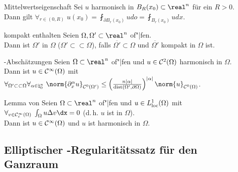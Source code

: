 \begin{Satz}{Mittelwertseigenschaft}
    Sei $u$ harmonisch in $B_R(x_0) \subset \real^n$ für ein $R > 0$.\\
    Dann gilt $\forall_{r \in (0, R)}\; u(x_0) = \fint_{\partial B_r(x_0)} udo =
    \fint_{B_r(x_0)} udx$.
\end{Satz}

\linie

\begin{Def}{kompakt enthalten}
    Seien $\Omega, \Omega' \subset \real^n$ of"|fen.\\
    Dann ist $\Omega'$ in $\Omega$ 
    ($\Omega' \subset\subset \Omega$), falls $\overline{\Omega'} \subset \Omega$ und
    $\overline{\Omega'}$ kompakt in $\Omega$ ist.
\end{Def}


\begin{Satz}{-Abschätzungen}
    Seien $\Omega \subset \real^n$ of"|fen und
    $u \in \mathcal{C}^2(\Omega)$ harmonisch in $\Omega$.\\
    Dann ist $u \in \mathcal{C}^\infty(\Omega)$ mit
    $\forall_{\Omega' \subset\subset \Omega} \forall_{\alpha \in \natural_0^n}\;
    \norm{\partial^\alpha_x u}_{\C^0(\Omega')} \le
    \left(\frac{n|\alpha|}{\dist(\Omega', \partial\Omega)}\right)^{|\alpha|}
    \norm{u}_{\C^0(\Omega)}$.
\end{Satz}

\begin{Lemma}{Lemma von }
    Seien $\Omega \subset \real^n$ of"|fen und $u \in L^1_{\text{loc}}(\Omega)$ mit
    $\forall_{v \in \C^\infty_c(\Omega)}\; \int_\Omega u \Delta v\dx = 0$
    (d.\,h. $u$ ist  in $\Omega$).\\
    Dann ist $u \in \mathcal{C}^\infty(\Omega)$ und $u$ ist harmonisch in $\Omega$.
\end{Lemma}

\pagebreak

\subsection{%
    Elliptischer -Regularitätssatz für den Ganzraum%
}

